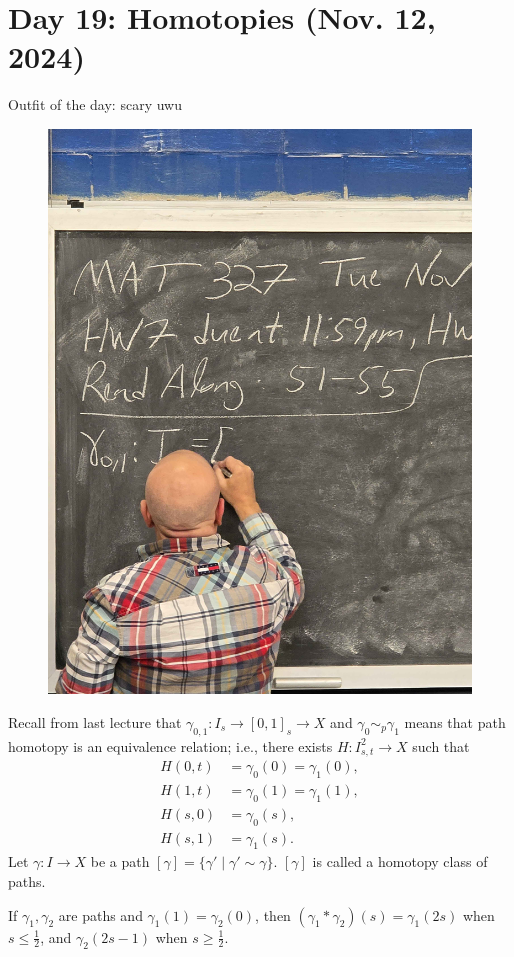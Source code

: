 \section{Day 19: Homotopies (Nov. 12, 2024)}
Outfit of the day: scary uwu
\begin{figure}[h]
    \centering
    \includegraphics[scale=0.1]{MAT327 Notes/Dror Shirts/dror day 19 shirt.jpg}
\end{figure}

\noindent Recall from last lecture that $\gamma_{0, 1} : I_s \to [0, 1]_s \to X$ and $\gamma_0 \sim_p \gamma_1$ means that path homotopy is an equivalence relation; i.e., there exists $H : I^2_{s, t} \to X$ such that
\begin{align*}
    H(0, t) &= \gamma_0(0) = \gamma_1(0), \\
    H(1, t) &= \gamma_0(1) = \gamma_1(1), \\
    H(s, 0) &= \gamma_0(s), \\
    H(s, 1) &= \gamma_1(s).
\end{align*}
\noindent Let $\gamma : I \to X$ be a path $[\gamma] = \{ \gamma' \mid \gamma' \sim \gamma \}$. $[\gamma]$ is called a homotopy class of paths.
\begin{definition}
    If $\gamma_1, \gamma_2$ are paths and $\gamma_1(1) = \gamma_2(0)$, then $(\gamma_1 \ast \gamma_2)(s) = \gamma_1(2s)$ when $s \leq \frac{1}{2}$, and $\gamma_2(2s - 1)$ when $s \geq \frac{1}{2}$.
\end{definition}

